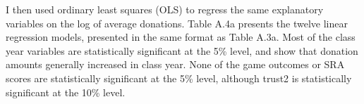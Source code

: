 \documentclass[12pt]{article}
\begin{document}
I then used ordinary least squares (OLS) to regress the same explanatory variables on the log of average donations. Table A.4a presents the twelve linear regression models, presented in the same format as Table A.3a. Most of the class year variables are statistically significant at the 5\% level, and show that donation amounts generally increased in class year. None of the game outcomes or SRA scores are statistically significant at the 5\% level, although trust2 is statistically significant at the 10\% level.

\end{document}
